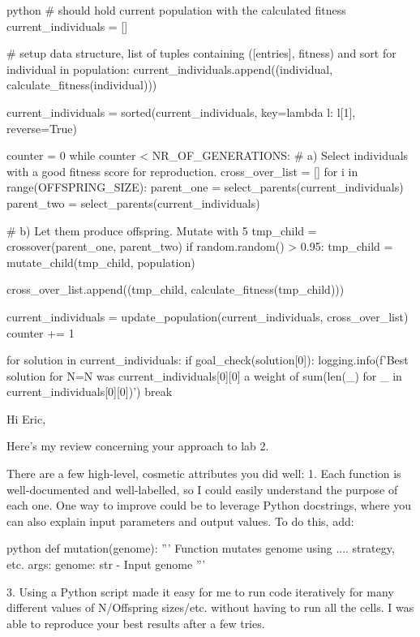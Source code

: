 \begin{mintedbox}{python}
    # should hold current population with the calculated fitness
    current_individuals = []

    # setup data structure, list of tuples containing ([entries], fitness) and sort
    for individual in population:
        current_individuals.append((individual, calculate_fitness(individual)))

    current_individuals = sorted(current_individuals, key=lambda l: l[1], reverse=True)

    counter = 0
    while counter < NR_OF_GENERATIONS:
        # a) Select individuals with a good fitness score for reproduction.
        cross_over_list = []
        for i in range(OFFSPRING_SIZE):
            parent_one = select_parents(current_individuals)
            parent_two = select_parents(current_individuals)

            # b) Let them produce offspring. Mutate with 5%
            tmp_child = crossover(parent_one, parent_two)
            if random.random() > 0.95:
                tmp_child = mutate_child(tmp_child, population)

            cross_over_list.append((tmp_child, calculate_fitness(tmp_child)))

        current_individuals = update_population(current_individuals, cross_over_list)
        counter += 1

    for solution in current_individuals:
        if goal_check(solution[0]):
            logging.info(f'Best solution for N={N} was {current_individuals[0][0]} \nWith a weight of {sum(len(_) for _ in current_individuals[0][0])}')
            break
\end{mintedbox}

Hi Eric,

Here's my review concerning your approach to lab 2.

There are a few high-level, cosmetic attributes you did well:
1. Each function is well-documented and well-labelled, so I could easily understand the purpose of each one. One way to improve could be to leverage Python docstrings, where you can also explain input parameters and output values. To do this, add:

\begin{mintedbox}{python}
def mutation(genome):
  '''
  Function mutates genome using .... strategy, etc.
  args:
  genome: str - Input genome
  '''
\end{mintedbox}

3. Using a Python script made it easy for me to run code iteratively for many different values of N/Offspring sizes/etc. without having to run all the cells. I was able to reproduce your best results after a few tries.

